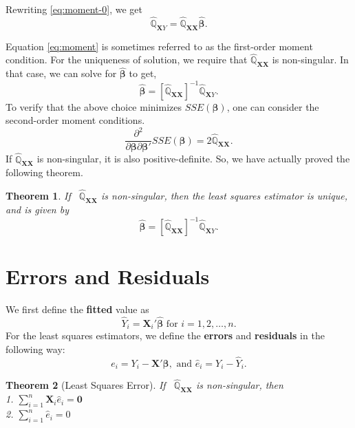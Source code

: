 \documentclass[
]{book}
\newtheorem{theorem}{Theorem}[chapter]
\theoremstyle{definition}
\theoremstyle{definition}
\theoremstyle{definition}
\theoremstyle{definition}
\theoremstyle{remark}
\begin{document}
Rewriting \eqref{eq:moment-0}, we get
\begin{equation}
\widehat{\mathbb{Q}}_{\pmb{X}Y}=\widehat{\mathbb{Q}}_{\pmb{XX}}
\widehat{\pmb{\beta}}.
\label{eq:moment}
\end{equation}

Equation \eqref{eq:moment} is sometimes referred to as the first-order moment condition. For the uniqueness of solution, we require that
\(\widehat{\mathbb{Q}}_{\pmb{XX}}\) is non-singular. In that case, we can solve for \(\widehat{\pmb{\beta}}\) to get,
\[
\widehat{\pmb{\beta}}=\left[\widehat{\mathbb{Q}}_{\pmb{XX}}\right]^{-1}
\widehat{\mathbb{Q}}_{\pmb{X}Y}.
\]
To verify that the above choice minimizes \(SSE(\pmb{\beta})\),
one can consider the second-order moment conditions.
\[
\frac{\partial^2}{\partial\pmb{\beta}\partial\pmb{\beta}'}SSE(\pmb{\beta})
=2\widehat{\mathbb{Q}}_{\pmb{XX}}.
\]
If \(\widehat{\mathbb{Q}}_{\pmb{XX}}\) is non-singular, it is also positive-definite. So, we have actually proved the following theorem.

\begin{theorem}
If ~\(\widehat{\mathbb{Q}}_{\pmb{XX}}\) is non-singular, then the
least squares estimator is unique, and is given by
\[
\widehat{\pmb{\beta}}=\left[\widehat{\mathbb{Q}}_{\pmb{XX}}\right]^{-1}
\widehat{\mathbb{Q}}_{\pmb{X}Y}.
\]
\end{theorem}

\hypertarget{errors-and-residuals}{%
\section{Errors and Residuals}\label{errors-and-residuals}}

We first define the \textbf{fitted} value as
\[
\widehat{Y}_i=\pmb{X}_i'\widehat{\pmb{\beta}}\mbox{ for }
i=1,2,\ldots,n.
\]
For the least squares estimators, we define the \textbf{errors} and \textbf{residuals} in the following way:
\[
e_i=Y_i-\pmb{X}'\pmb{\beta}, \mbox{ and } 
\widehat{e}_i=Y_i-\widehat{Y}_i.
\]

\begin{theorem}[Least Squares Error]
\protect\hypertarget{thm:olserror}{}\label{thm:olserror}If ~\(\widehat{\mathbb{Q}}_{\pmb{XX}}\) is non-singular, then\\
1. \(\sum\limits_{i=1}^n\pmb{X}_i\widehat{e}_i=\pmb{0}\)\\
2. \(\sum\limits_{i=1}^n\widehat{e}_i=0\)
\end{theorem}
\end{document}
